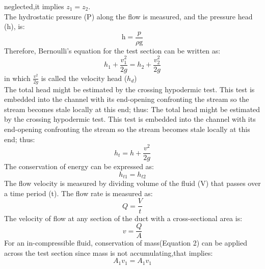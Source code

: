 \documentclass[12pt,a4paper]{article}
\begin{document}
neglected,it implies $z_1=z_2$.\\
The hydrostatic pressure (P) along the flow is measured, and the pressure
head (h), is:
\begin{equation}
\text{h} = \frac{p}{\text{$\rho$g}}
\end{equation}
Therefore, Bernoulli’s equation for the test section can be written as:
\begin{equation}
h_1 + \frac{v_1^2}{2g} = h_2 + \frac{v_2^2}{2g}
\end{equation}
in which $\frac{v^2}{2g}$ is called the velocity head ($h_d$)\\
The total head might be estimated by the crossing hypodermic test. This
test is embedded into the channel with its end-opening confronting the
stream so the stream becomes stale locally at this end; thus:
The total head might be estimated by the crossing hypodermic test. This test is embedded into the channel with its end-opening confronting the stream so the stream becomes stale locally at this end; thus:
\begin{equation}
h_t  = h + \frac{v^2}{2g}
\end{equation}
The conservation of energy can be expressed as:
\begin{equation}
h_{t1}  = h_{t2} 
\end{equation}
The flow velocity is measured by dividing volume of the fluid (V) that passes over a time period (t). The flow rate is measured as:
\begin{equation}
Q  = \frac{V}{t}
\end{equation}
The velocity of flow at any section of the duct with a cross-sectional area is:
\begin{equation}
v  = \frac{Q}{A}
\end{equation}
For an in-compressible fluid, conservation of mass(Equation 2) can be applied across the test section since mass is not accumulating,that implies:
\begin{equation}
A_1 v_1  = A_1 v_1
\end{equation}
\end{document}
